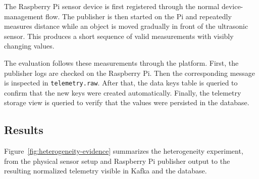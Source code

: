The Raspberry Pi sensor device is first registered through the normal device-management flow. The publisher is then started on the Pi and repeatedly measures distance while an object is moved gradually in front of the ultrasonic sensor. This produces a short sequence of valid measurements with visibly changing values.

The evaluation follows these measurements through the platform. First, the publisher logs are checked on the Raspberry Pi. Then the corresponding message is inspected in \texttt{telemetry.raw}. After that, the data keys table is queried to confirm that the new keys were created automatically. Finally, the telemetry storage view is queried to verify that the values were persisted in the database.

\subsection{Results}
\label{subsec:EvalHeterogeneityResults}

Figure~\ref{fig:heterogeneity-evidence} summarizes the heterogeneity experiment, from the physical sensor setup and Raspberry Pi publisher output to the resulting normalized telemetry visible in Kafka and the database.

